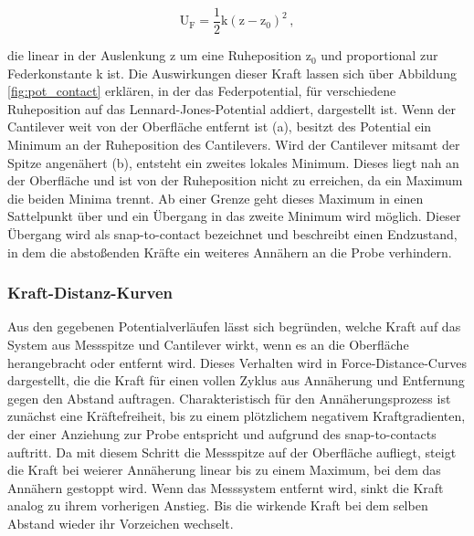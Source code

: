           \begin{equation*}
            \text{U}_{\text{F}} = \frac{1}{2} \text{k} \left(\text{z} - \text{z}_0\right)^2 \, ,
          \end{equation*}
          
          die linear in der Auslenkung z um eine Ruheposition z$_0$ und proportional zur Federkonstante k ist. Die Auswirkungen dieser Kraft lassen sich über Abbildung \ref{fig:pot_contact} erklären, in der 
          das Federpotential, für verschiedene Ruheposition auf das Lennard-Jones-Potential addiert, dargestellt ist. Wenn der Cantilever weit von der Oberfläche entfernt ist (a), besitzt des Potential ein 
          Minimum an der Ruheposition des Cantilevers. Wird der Cantilever mitsamt der Spitze angenähert (b), entsteht ein zweites lokales Minimum. Dieses liegt nah an der Oberfläche und ist von der Ruheposition
          nicht zu erreichen, da ein Maximum die beiden Minima trennt. Ab einer Grenze geht dieses Maximum in einen Sattelpunkt über und ein Übergang in das zweite Minimum wird möglich. Dieser Übergang wird als
          snap-to-contact bezeichnet und beschreibt einen Endzustand, in dem die abstoßenden Kräfte ein weiteres Annähern an die Probe verhindern. 





        \subsubsection{Kraft-Distanz-Kurven}

          Aus den gegebenen Potentialverläufen lässt sich begründen, welche Kraft auf das System aus Messspitze und Cantilever wirkt, wenn es an die Oberfläche herangebracht oder entfernt wird. Dieses Verhalten
          wird in Force-Distance-Curves dargestellt, die die Kraft für einen vollen Zyklus aus Annäherung und Entfernung gegen den Abstand auftragen. Charakteristisch für den Annäherungsprozess ist zunächst
          eine Kräftefreiheit, bis zu einem plötzlichem negativem Kraftgradienten, der einer Anziehung zur Probe entspricht und aufgrund des snap-to-contacts auftritt. Da mit diesem Schritt die Messspitze auf 
          der Oberfläche aufliegt, steigt die Kraft bei weierer Annäherung linear bis zu einem Maximum, bei dem das Annähern gestoppt wird. Wenn das Messsystem entfernt wird, sinkt die Kraft analog zu ihrem 
          vorherigen Anstieg. Bis die wirkende Kraft bei dem selben Abstand wieder ihr Vorzeichen wechselt.


